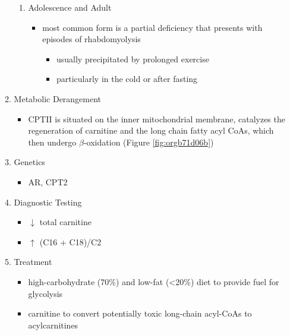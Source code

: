 \documentclass{scrartcl}
\begin{document}
\begin{enumerate}
\begin{enumerate}
\begin{enumerate}
\item Adolescence and Adult
\label{sec:orgb99cd90}
\begin{itemize}
\item most common form is a partial deficiency that presents with
episodes of rhabdomyolysis
\begin{itemize}
\item usually precipitated by prolonged exercise
\item particularly in the cold or after fasting
\end{itemize}
\end{itemize}
\end{enumerate}

\item Metabolic Derangement
\label{sec:org10de811}
\begin{itemize}
\item CPTII is situated on the inner mitochondrial membrane, catalyzes the
regeneration of carnitine and the long chain fatty acyl CoAs, which
then undergo \(\beta\)-oxidation (Figure \ref{fig:orgb71d06b})
\end{itemize}
\item Genetics
\label{sec:org35aad9d}
\begin{itemize}
\item AR, CPT2
\end{itemize}
\item Diagnostic Testing
\label{sec:org20f749b}
\begin{itemize}
\item \(\downarrow\) total carnitine
\item \(\uparrow\) (C16 + C18)/C2
\end{itemize}

\item Treatment
\label{sec:org74ed784}
\begin{itemize}
\item high-carbohydrate (70\%) and low-fat (<20\%) diet to provide fuel for glycolysis
\item carnitine to convert potentially toxic long-chain acyl-CoAs to
acylcarnitines
\end{itemize}
\end{enumerate}
\end{enumerate}
\end{document}
